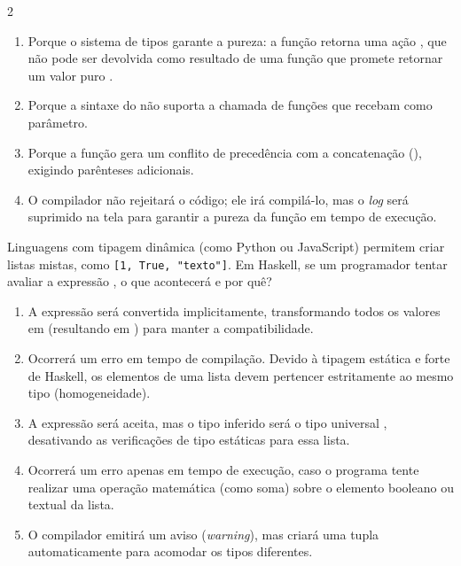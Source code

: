 \documentclass[a4paper,10pt,brazil]{article}
\begin{document}
\begin{multicols}{2}
\begin{enumerate}
  \item Porque o sistema de tipos garante a pureza: a função  retorna uma ação , que não pode ser devolvida como resultado de uma função que promete retornar um valor puro .

  \item Porque a sintaxe do  não suporta a chamada de funções que recebam  como parâmetro.

  \item Porque a função  gera um conflito de precedência com a concatenação (\haskellinline{++}), exigindo parênteses adicionais.

  \item O compilador não rejeitará o código; ele irá compilá-lo, mas o \emph{log} será suprimido na tela para garantir a pureza da função em tempo de execução.


\end{enumerate}

Linguagens com tipagem dinâmica (como Python ou JavaScript) permitem criar listas mistas, como \texttt{[1, True, "texto"]}. Em Haskell, se um programador tentar avaliar a expressão , o que acontecerá e por quê?

\begin{enumerate}
  \item A expressão será convertida implicitamente, transformando todos os valores em  (resultando em ) para manter a compatibilidade.

  \item Ocorrerá um erro em tempo de compilação. Devido à tipagem estática e forte de Haskell, os elementos de uma lista devem pertencer estritamente ao mesmo tipo (homogeneidade).

  \item A expressão será aceita, mas o tipo inferido será o tipo universal , desativando as verificações de tipo estáticas para essa lista.

  \item Ocorrerá um erro apenas em tempo de execução, caso o programa tente realizar uma operação matemática (como soma) sobre o elemento booleano ou textual da lista.

  \item O compilador emitirá um aviso (\emph{warning}), mas criará uma tupla automaticamente para acomodar os tipos diferentes.



\end{enumerate}
\end{multicols}
\end{document}
